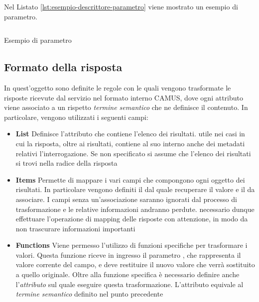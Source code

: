 Nel Listato \ref{lst:esempio-descrittore-parametro} viene mostrato un esempio di parametro.

\begin{listing}[H]
	\inputminted{json}{5-implementazione-backend/Codice/esempio_descrittore_parametro.json}
	\caption{Esempio di parametro}
	\label{lst:esempio-descrittore-parametro}
\end{listing}

\subsection{Formato della risposta\label{sec:descrittore-risposta}}

In quest'oggetto sono definite le regole con le quali vengono trasformate le risposte ricevute dal servizio nel formato interno CAMUS, dove ogni attributo viene associato a un rispetto \emph{termine semantico} che ne definisce il contenuto. In particolare, vengono utilizzati i seguenti campi:

\begin{itemize}
	\item \textbf{List} Definisce l'attributo che contiene l'elenco dei risultati. \upe utile nei casi in cui la risposta, oltre ai risultati, contiene al suo interno anche dei metadati relativi l'interrogazione. Se non specificato si assume che l'elenco dei risultati si trovi nella radice della risposta
	\item \textbf{Items} Permette di mappare i vari campi che compongono ogni oggetto dei risultati. In particolare vengono definiti il  dal quale recuperare il valore e il  da associare. I campi senza un'associazione saranno ignorati dal processo di trasformazione e le relative informazioni andranno perdute. \upe necessario dunque effettuare l'operazione di mapping delle risposte con attenzione, in modo da non trascurare informazioni importanti
	\item \textbf{Functions} Viene permesso l'utilizzo di funzioni specifiche per trasformare i valori. Questa funzione riceve in ingresso il parametro , che rappresenta il valore corrente del campo, e deve restituire il nuovo valore che verrà sostituito a quello originale. Oltre alla funzione specifica è necessario definire anche l'\emph{attributo} sul quale eseguire questa trasformazione. L'attributo equivale al \emph{termine semantico} definito nel punto precedente
\end{itemize}

